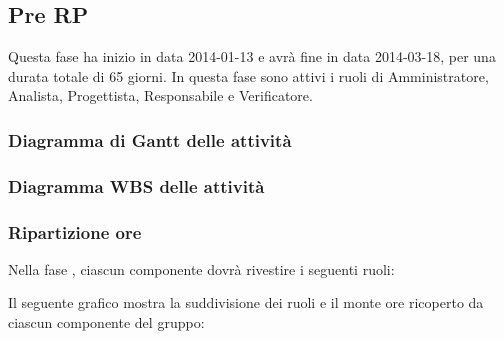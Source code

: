 \subsection{Pre RP}
Questa fase ha inizio in data 2014-01-13 e avrà fine in data 2014-03-18, per una durata totale di 65 giorni. In questa fase sono attivi i ruoli di Amministratore, Analista, Progettista, Responsabile e Verificatore.

\subsubsection{Diagramma di Gantt delle attività}

\newpage
\subsubsection{Diagramma WBS delle attività}

\newpage
\subsubsection{Ripartizione ore}

\newpage
Nella fase , ciascun componente dovrà rivestire i seguenti ruoli:

Il seguente grafico mostra la suddivisione dei ruoli e il monte ore ricoperto da ciascun componente del gruppo:
